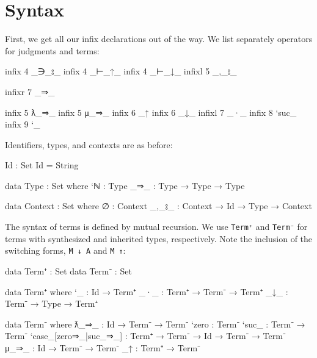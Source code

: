 \hypertarget{syntax}{%
\section{Syntax}\label{syntax}}

First, we get all our infix declarations out of the way. We list
separately operators for judgments and terms:

\begin{fence}
\begin{code}
infix   4  _∋_⦂_
infix   4  _⊢_↑_
infix   4  _⊢_↓_
infixl  5  _,_⦂_

infixr  7  _⇒_

infix   5  ƛ_⇒_
infix   5  μ_⇒_
infix   6  _↑
infix   6  _↓_
infixl  7  _·_
infix   8  `suc_
infix   9  `_
\end{code}
\end{fence}

Identifiers, types, and contexts are as before:

\begin{fence}
\begin{code}
Id : Set
Id = String

data Type : Set where
  `ℕ    : Type
  _⇒_   : Type → Type → Type

data Context : Set where
  ∅     : Context
  _,_⦂_ : Context → Id → Type → Context
\end{code}
\end{fence}

The syntax of terms is defined by mutual recursion. We use
\texttt{Term⁺} and \texttt{Term⁻} for terms with synthesized and
inherited types, respectively. Note the inclusion of the switching
forms, \texttt{M\ ↓\ A} and \texttt{M\ ↑}:

\begin{fence}
\begin{code}
data Term⁺ : Set
data Term⁻ : Set

data Term⁺ where
  `_                        : Id → Term⁺
  _·_                       : Term⁺ → Term⁻ → Term⁺
  _↓_                       : Term⁻ → Type → Term⁺

data Term⁻ where
  ƛ_⇒_                     : Id → Term⁻ → Term⁻
  `zero                    : Term⁻
  `suc_                    : Term⁻ → Term⁻
  `case_[zero⇒_|suc_⇒_]    : Term⁺ → Term⁻ → Id → Term⁻ → Term⁻
  μ_⇒_                     : Id → Term⁻ → Term⁻
  _↑                       : Term⁺ → Term⁻
\end{code}
\end{fence}

